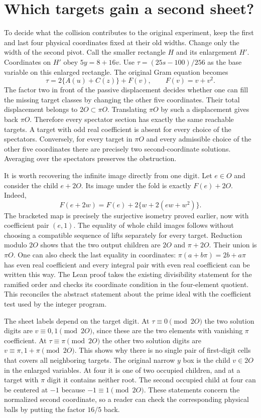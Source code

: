 \documentclass[12pt,letterpaper]{article}
\begin{document}
\section{Which targets gain a second sheet?}
To decide what the collision contributes to the original experiment, keep the first and last four physical coordinates fixed at their old widths. Change only the width of the second pivot. Call the smaller rectangle $H$ and its enlargement $H'$. Coordinates on $H'$ obey $5y=8+16v$. Use $\tau=(25s-100)/256$ as the base variable on this enlarged rectangle. The original Gram equation becomes
\[
 \tau=2\{A(u)+C(z)\}+F(v),\qquad F(v)=v+v^2.
\]
The factor two in front of the passive displacement decides whether one can fill the missing target classes by changing the other five coordinates. Their total displacement belongs to $2O\subset\pi O$. Translating $\pi O$ by such a displacement gives back $\pi O$. Therefore every spectator section has exactly the same reachable targets. A target with odd real coefficient is absent for every choice of the spectators. Conversely, for every target in $\pi O$ and every admissible choice of the other five coordinates there are precisely two second-coordinate solutions. Averaging over the spectators preserves the obstruction.

It is worth recovering the infinite image directly from one digit. Let $e\in O$ and consider the child $e+2O$. Its image under the fold is exactly $F(e)+2O$. Indeed,
\[
 F(e+2w)=F(e)+2\{w+2(ew+w^2)\}.
\]
The bracketed map is precisely the surjective isometry proved earlier, now with coefficient pair $(e,1)$. The equality of whole child images follows without choosing a compatible sequence of lifts separately for every target. Reduction modulo $2O$ shows that the two output children are $2O$ and $\pi+2O$. Their union is $\pi O$. One can also check the last equality in coordinates: $\pi(a+b\pi)=2b+a\pi$ has even real coefficient and every integral pair with even real coefficient can be written this way. The Lean proof takes the existing divisibility statement for the ramified order and checks its coordinate condition in the four-element quotient. This reconciles the abstract statement about the prime ideal with the coefficient test used by the integer program.

The sheet labels depend on the target digit. At $\tau\equiv0\pmod{2O}$ the two solution digits are $v\equiv0,1\pmod{2O}$, since these are the two elements with vanishing $\pi$ coefficient. At $\tau\equiv\pi\pmod{2O}$ the other two solution digits are $v\equiv\pi,1+\pi\pmod{2O}$. This shows why there is no single pair of first-digit cells that covers all neighboring targets. The original narrow $y$ box is the child $v\in2O$ in the enlarged variables. At four it is one of two occupied children, and at a target with $\pi$ digit it contains neither root. The second occupied child at four can be centered at $-1$ because $-1\equiv1\pmod{2O}$. These statements concern the normalized second coordinate, so a reader can check the corresponding physical balls by putting the factor $16/5$ back.
\end{document}
